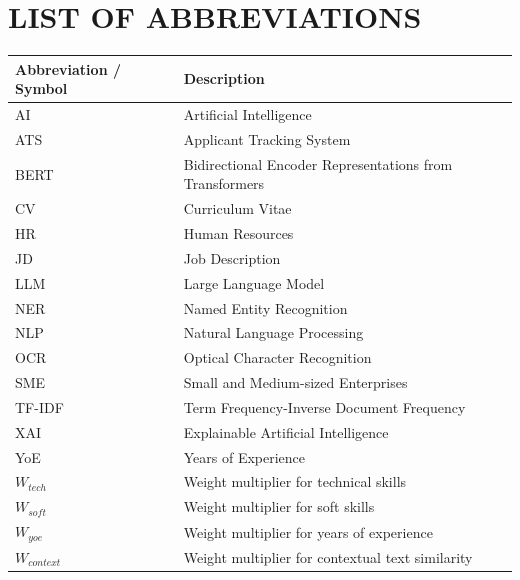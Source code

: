 \chapter*{LIST OF ABBREVIATIONS}


\begin{longtable}{p{}p{}}
\toprule
\textbf{Abbreviation / Symbol} & \textbf{Description}\\
\midrule
AI & Artificial Intelligence\\
ATS & Applicant Tracking System\\
BERT & Bidirectional Encoder Representations from Transformers\\
CV & Curriculum Vitae\\
HR & Human Resources\\
JD & Job Description\\
LLM & Large Language Model\\
NER & Named Entity Recognition\\
NLP & Natural Language Processing\\
OCR & Optical Character Recognition\\
SME & Small and Medium-sized Enterprises\\
TF-IDF & Term Frequency-Inverse Document Frequency\\
XAI & Explainable Artificial Intelligence\\
YoE & Years of Experience\\
\(W_{tech}\) & Weight multiplier for technical skills\\
\(W_{soft}\) & Weight multiplier for soft skills\\
\(W_{yoe}\) & Weight multiplier for years of experience\\
\(W_{context}\) & Weight multiplier for contextual text similarity\\
\bottomrule
\end{longtable}

\clearpage
